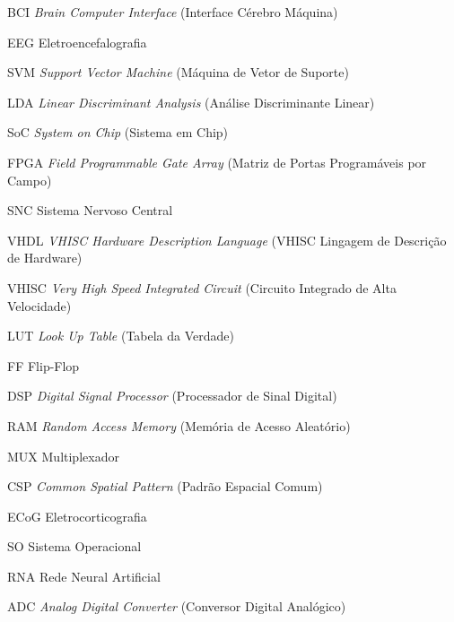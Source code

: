 \begin{siglas}
  \item[BCI] \textit{Brain Computer Interface} (Interface Cérebro Máquina)
  \item[EEG] Eletroencefalografia
  \item[SVM] \textit{Support Vector Machine} (Máquina de Vetor de Suporte)
  \item[LDA] \textit{Linear Discriminant Analysis} (Análise Discriminante Linear)
  \item[SoC] \textit{System on Chip} (Sistema em Chip)
  \item[FPGA] \textit{Field Programmable Gate Array} (Matriz de Portas Programáveis por Campo) 
  \item[SNC] Sistema Nervoso Central
  \item[VHDL] \textit{VHISC Hardware Description Language} (VHISC Lingagem de Descrição de Hardware)
  \item[VHISC] \textit{Very High Speed Integrated Circuit} (Circuito Integrado de Alta Velocidade)
  \item[LUT] \textit{Look Up Table} (Tabela da Verdade)
  \item[FF] Flip-Flop
  \item[DSP] \textit{Digital Signal Processor} (Processador de Sinal Digital)
  \item[RAM] \textit{Random Access Memory} (Memória de Acesso Aleatório)
  \item[MUX] Multiplexador
  \item[CSP] \textit{Common Spatial Pattern} (Padrão Espacial Comum)
  \item[ECoG] Eletrocorticografia
  \item[SO] Sistema Operacional
  \item[RNA] Rede Neural Artificial
  \item[ADC] \textit{Analog Digital Converter} (Conversor Digital Analógico)
  
\end{siglas}
